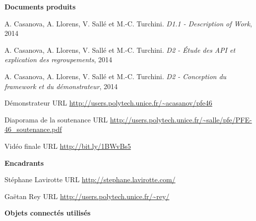 \documentclass[nocopyrightspace]{sigplanconf}
\begin{document}

%

\newpage

\begin{thebibliography}{10}
\softraggedright

\item[]\hspace{-\labelwidth}\hspace{-\labelsep}\textbf{Documents produits}

A. Casanova, A. Llorens, V. Sallé et M.-C. Turchini.
\newblock \emph{D1.1 - Description of Work},
2014

A. Casanova, A. Llorens, V. Sallé et M.-C. Turchini.
\newblock \emph{D2 - Étude des API et explication des regroupements},
2014

A. Casanova, A. Llorens, V. Sallé et M.-C. Turchini.
\newblock \emph{D2 - Conception du framework et du démonstrateur},
2014

Démonstrateur
\newblock URL \url{http://users.polytech.unice.fr/~acasanov/pfe46}

Diaporama de la soutenance
\newblock URL \url{http://users.polytech.unice.fr/~salle/pfe/PFE-46_soutenance.pdf}

Vidéo finale
\newblock URL \url{http://bit.ly/1BWvBs5}

\item[]\hspace{-\labelwidth}\hspace{-\labelsep}\textbf{Encadrants}

Stéphane Lavirotte
\newblock URL \url{http://stephane.lavirotte.com/}

Gaëtan Rey
\newblock URL \url{http://users.polytech.unice.fr/~rey/}

\item[]\hspace{-\labelwidth}\hspace{-\labelsep}\textbf{Objets connectés utilisés}


\end{thebibliography}
\end{document}
